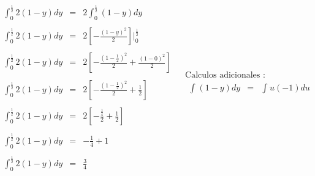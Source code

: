 \documentclass[12pt]{article}
\begin{document}
    \begin{center}
        \begin{equation*}
            \begin{array}{c|c}
                \begin{array}{rcl}
                    \displaystyle \int_{0}^{\frac{1}{2}} 2\left(1-y\right) dy & = & \displaystyle 2\int_{0}^{\frac{1}{2}}\left(1-y\right)dy
                    \\
                    \\
                    \displaystyle \int_{0}^{\frac{1}{2}} 2\left(1-y\right) dy & = & \displaystyle 2\left[-\frac{\left(1-y\right)^2}{2}\right]\vert_{0}^{\frac{1}{2}}
                    \\
                    \\
                    \displaystyle \int_{0}^{\frac{1}{2}} 2\left(1-y\right) dy & = & \displaystyle 2\left[-\frac{\left(1-\frac{1}{2}\right)^2}{2}+ \frac{\left(1-0\right)^2}{2}\right]
                    \\
                    \\
                    \displaystyle \int_{0}^{\frac{1}{2}} 2\left(1-y\right) dy & = & \displaystyle 2\left[-\frac{\left(1-\frac{1}{2}\right)^2}{2}+ \frac{1}{2}\right]
                    \\
                    \\
                    \displaystyle \int_{0}^{\frac{1}{2}} 2\left(1-y\right) dy & = & \displaystyle 2\left[-\frac{\frac{1}{4}}{2}+ \frac{1}{2}\right]
                    \\
                    \\
                    \displaystyle \int_{0}^{\frac{1}{2}} 2\left(1-y\right) dy & = & \displaystyle -\frac{1}{4}+1
                    \\
                    \\
                    \displaystyle \int_{0}^{\frac{1}{2}} 2\left(1-y\right) dy & = &\frac{3}{4}
                \end{array}
                &
                \begin{array}{l}
                    \mbox{Calculos adicionales :}
                    \\
                    \begin{array}{rcl}
                        \displaystyle\int_{}^{} \left(1-y\right) dy & = & \displaystyle\int_{}^{}u (-1) du
                        \\
                        \\

\end{array}
\end{array}
\end{array}
\end{equation*}
\end{center}
\end{document}
